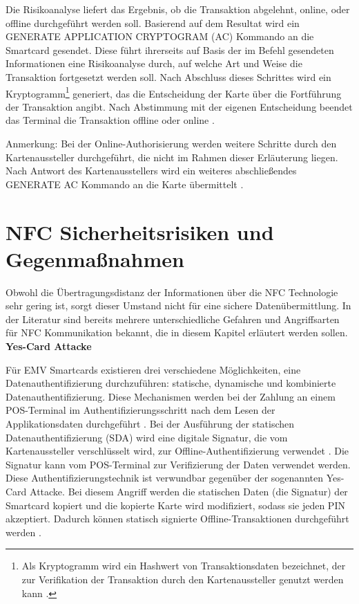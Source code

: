 Die Risikoanalyse liefert das Ergebnis, ob die Transaktion abgelehnt, online, oder offline durchgeführt werden soll. Basierend auf dem Resultat wird ein GENERATE APPLICATION CRYPTOGRAM (AC) Kommando an die Smartcard gesendet. Diese führt ihrerseits auf Basis der im Befehl gesendeten Informationen eine Risikoanalyse durch, auf welche Art und Weise die Transaktion fortgesetzt werden soll. Nach Abschluss dieses Schrittes wird ein Kryptogramm\footnote{Als Kryptogramm wird ein Hashwert von Transaktionsdaten bezeichnet, der zur Verifikation der Transaktion durch den Kartenaussteller genutzt werden kann \cite{howemvpaymentworks}.} generiert, das die Entscheidung der Karte über die Fortführung der Transaktion angibt. Nach Abstimmung mit der eigenen Entscheidung beendet das Terminal die Transaktion offline oder online \cite{howemvpaymentworks, emvbook3}. 

Anmerkung: Bei der Online-Authorisierung werden weitere Schritte durch den Kartenaussteller durchgeführt, die nicht im Rahmen dieser Erläuterung liegen. Nach Antwort des Kartenausstellers wird ein weiteres abschließendes GENERATE AC Kommando an die Karte übermittelt \cite{howemvpaymentworks}. 

\section{NFC Sicherheitsrisiken und Gegenmaßnahmen}

Obwohl die Übertragungsdistanz der Informationen über die NFC Technologie sehr gering ist, sorgt dieser Umstand nicht für eine sichere Datenübermittlung. In der Literatur sind bereits mehrere unterschiedliche Gefahren und Angriffsarten für NFC Kommunikation bekannt, die in diesem Kapitel erläutert werden sollen. 
\newline
\newline
\textbf{Yes-Card Attacke}

Für EMV Smartcards existieren drei verschiedene Möglichkeiten, eine Datenauthentifizierung durchzuführen: statische, dynamische und kombinierte Datenauthentifizierung. Diese Mechanismen werden bei der Zahlung an einem POS-Terminal im Authentifizierungsschritt nach dem Lesen der Applikationsdaten durchgeführt \cite{emvbook3, nfcRelayWithOffTheShelfHardAndSoftware}. Bei der Ausführung der statischen Datenauthentifizierung (SDA) wird eine digitale Signatur, die vom Kartenaussteller verschlüsselt wird, zur Offline-Authentifizierung verwendet \cite{sda}. Die Signatur kann vom POS-Terminal zur Verifizierung der Daten verwendet werden. Diese Authentifizierungstechnik ist verwundbar gegenüber der sogenannten Yes-Card Attacke. Bei diesem Angriff werden die statischen Daten (die Signatur) der Smartcard kopiert und die kopierte Karte wird modifiziert, sodass sie jeden PIN akzeptiert. Dadurch können statisch signierte Offline-Transaktionen durchgeführt werden \cite{nfcRelayWithOffTheShelfHardAndSoftware, Madlmayr2014}. 


